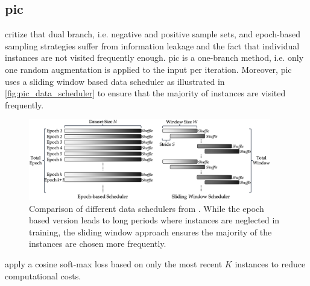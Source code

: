 \subsection{\acl{pic}}\label{subsec:PIC}

\citet{PIC_2020} critize that dual branch, i.e. negative and positive sample sets, 
and epoch-based sampling strategies suffer from information leakage and 
the fact that individual instances are not visited frequently enough.
\ac{pic} is a one-branch method, i.e. only one random augmentation is applied to the input per iteration.
Moreover, \ac{pic} uses a sliding window based data scheduler 
as illustrated in \autoref{fig:pic_data_scheduler}
to ensure that the majority of instances are visited frequently.

\begin{figure}[!htb] %
    \centering
    \includegraphics[width=300pt]{images/PIC_data_scheduler.png}
    \caption{Comparison of different data schedulers from \citet{PIC_2020}.
    While the epoch based version leads to long periods where instances are neglected in training,
    the sliding window approach ensures the majority of the instances are chosen more frequently.}
    \label{fig:pic_data_scheduler}
\end{figure}

\citeauthor{PIC_2020} apply a cosine soft-max loss based on only the most recent $K$ instances 
to reduce computational costs.
